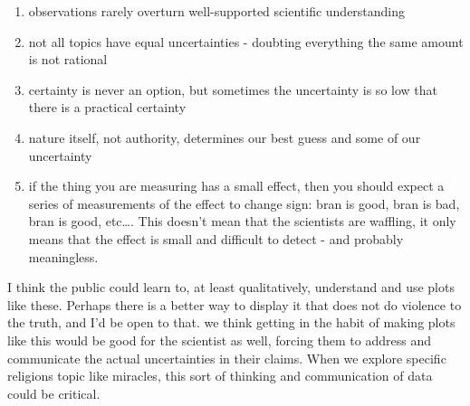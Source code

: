 \begin{enumerate}
\def\labelenumi{\arabic{enumi}.}
\itemsep1pt\parskip0pt
\item
  observations rarely overturn well-supported scientific understanding
\item
  not all topics have equal uncertainties - doubting everything the same
  amount is not rational
\item
  certainty is never an option, but sometimes the uncertainty is so low
  that there is a practical certainty
\item
  nature itself, not authority, determines our best guess and some of
  our uncertainty
\item
  if the thing you are measuring has a small effect, then you should
  expect a series of measurements of the effect to change sign: bran is
  good, bran is bad, bran is good, etc\ldots{}. This doesn't mean that
  the scientists are waffling, it only means that the effect is small
  and difficult to detect - and probably meaningless.
\end{enumerate}

I think the public could learn to, at least qualitatively, understand
and use plots like these. Perhaps there is a better way to display it
that does not do violence to the truth, and I'd be open to that. we think getting in the habit of making plots like this would be good for the
scientist as well, forcing them to address and communicate the actual
uncertainties in their claims.  When we explore specific religions topic like miracles, this sort of thinking and communication of data could be critical.
